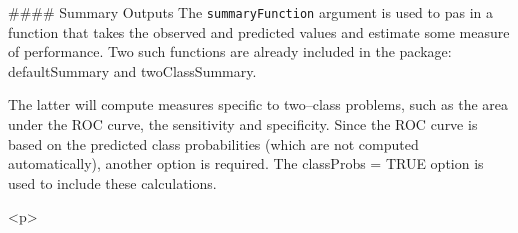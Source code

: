 


#### Summary Outputs
The \texttt{summaryFunction} argument is used to pas in a function that takes the observed and predicted
values and estimate some measure of performance. Two such functions are already included in the
package: defaultSummary and twoClassSummary. 

The latter will compute measures speciﬁc to two–class
problems, such as the area under the ROC curve, the sensitivity and speciﬁcity. Since the ROC
curve is based on the predicted class probabilities (which are not computed automatically), another
option is required. The classProbs = TRUE option is used to include these calculations.


<p>
